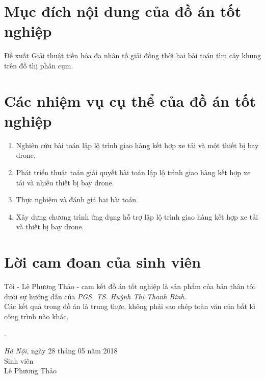 \documentclass[a4paper,12pt]{report}
\begin{document}
\section*{Mục đích nội dung của đồ án tốt nghiệp}
Đề xuất Giải thuật tiến hóa đa nhân tố giải đồng thời hai bài toán tìm cây khung trên đồ thị phân cụm.
\section*{Các nhiệm vụ cụ thể của đồ án tốt nghiệp}
\begin{enumerate}
\item Nghiên cứu bài toán lập lộ trình giao hàng kết hợp xe tải và một thiết bị bay drone.
\item Phát triển thuật toán giải quyết bài toán lập lộ trình giao hàng kết hợp xe tải và nhiều thiết bị bay drone.
\item Thực nghiệm và đánh giá hai bài toán.
\item Xây dựng chương trình ứng dụng hỗ trợ lập lộ trình giao hàng kết hợp xe tải và thiết bị bay drone.
\end{enumerate}
\section*{Lời cam đoan của sinh viên}
Tôi - Lê Phương Thảo - cam kết đồ án tốt nghiệp là sản phẩm  của bản thân tôi dưới sự hướng dẫn của \textit{PGS. TS. Huỳnh Thị Thanh Bình}.  \\

Các kết quả trong đồ án 	là trung thực, không phải sao chép toàn văn của bất kì công trình nào khác.\\

\begin{minipage}{0.5\textwidth}
.
\end{minipage}
\begin{minipage}[t]{0.5\textwidth}

\begin{center}
\textit{Hà Nội}, ngày 28 tháng 05 năm 2018 \\
Sinh viên\\[3cm]

Lê Phương Thảo
\end{center}
\end{minipage}
\end{document}
